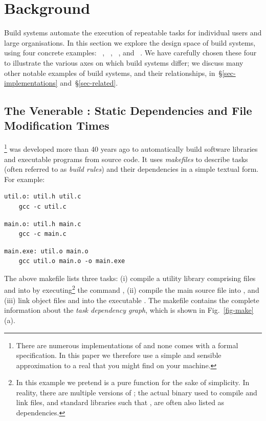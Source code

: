 \section{Background}\label{sec-background}

Build systems automate the execution of repeatable tasks for individual users
and large organisations. In this section we explore the design space of build
systems, using four concrete examples: \Make~\cite{feldman1979make},
\Shake~\cite{mitchell2012shake}, \Bazel~\cite{bazel}, and
\Excel~\cite{advanced_excel}.
We have carefully chosen these four to illustrate the various axes on which
build systems differ; we discuss many other notable examples of build systems,
and their relationships, in~\S\ref{sec-implementations} and~\S\ref{sec-related}.

\subsection{The Venerable \Make: Static Dependencies and File Modification Times}
\label{sec-background-make}

\Make\footnote{There are numerous implementations of \Make and none comes with a
formal specification. In this paper we therefore use a simple and sensible
approximation to a real \Make that you might find on your machine.} was developed
more than 40 years ago to automatically build software libraries and executable
programs from source code. It uses \emph{makefiles} to describe tasks (often
referred to as \emph{build rules}) and their dependencies in a simple textual form.
For example:

\vspace{1mm}
\begin{verbatim}
util.o: util.h util.c
    gcc -c util.c
\end{verbatim}
\vspace{1mm}
\begin{verbatim}
main.o: util.h main.c
    gcc -c main.c
\end{verbatim}
\vspace{1mm}
\begin{verbatim}
main.exe: util.o main.o
    gcc util.o main.o -o main.exe
\end{verbatim}
\vspace{1mm}

\noindent
The above makefile lists three tasks: (i) compile a utility library comprising
files  and  into  by
executing\footnote{In this example we pretend  is a pure function for
the sake of simplicity. In reality, there are multiple versions of ;
the actual binary used to compile and link files, and standard libraries
such that , are often also listed as dependencies.} the command
, (ii) compile the main source file  into
, and (iii) link object files  and  into the
executable . The makefile contains the complete information about
the \emph{task dependency graph}, which is shown in Fig.~\ref{fig-make}(a).

